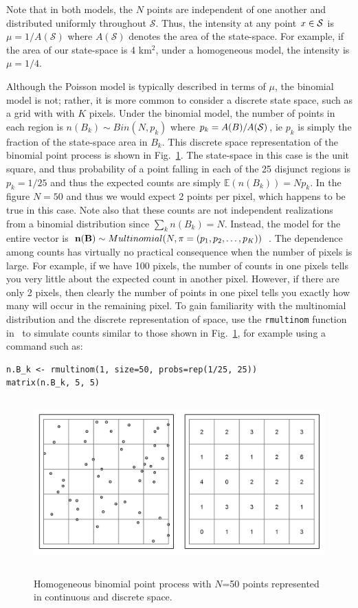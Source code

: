 Note that in both models, the $N$ points are independent
of one another and distributed uniformly
throughout $\mathcal{S}$. Thus, the intensity at any point $x \in
\cal{S}$ is $\mu = 1 / A(\mathcal{S})$ where $A(\mathcal{S})$ denotes
the area of the state-space. For example, if the area of our
state-space is 4 km$^2$,
under a homogeneous model, the intensity is $\mu = 1/4$.

Although the Poisson model is typically described in terms of $\mu$,
the binomial model is not; rather, it
is more common to consider a discrete state space, such as a grid with
with $K$ pixels. Under the binomial model, the number of points in
each region is $n(B_k) \sim Bin(N, p_k)$
where $p_k = A(B)/A(\cal{S})$, ie $p_k$ is simply the fraction of
the state-space area in $B_k$. This discrete space representation of
the binomial point process is shown in Fig.~\ref{ch9:fig:homo}. The
state-space in this case is the unit square, and thus probability of a
point falling in each of the 25 disjunct regions is $p_k = 1/25$ and
thus the expected counts are simply $\mathbb{E}(n(B_k)) = Np_k$. In
the figure $N=50$ and thus we would expect 2 points per pixel, which
happens to be true in this case. Note also that these counts are not
independent realizations from a binomial distribution since $\sum_k
n(B_k) = N$. Instead, the model for the entire vector
is ${\bf n(B)} \sim Multinomial(N, {\mathbf{\pi}} = (p_1, p_2, \dots,
p_K))$ \citep{illian:2008}. The dependence among counts has virtually
no practical consequence when the number of pixels is large. For
example, if we have 100 pixels, the number of counts in one pixels
tells you very little about the expected count in another
pixel. However, if there are only 2 pixels, then clearly the number of
points in one pixel tells you exactly how many will occur in the
remaining pixel. To gain familiarity with the multinomial distribution
and the discrete representation of space, use the \verb+rmultinom+
function in \R~to simulate counts similar to those shown in
Fig.~\ref{ch9:fig:homo}, for example using a command
such as:

\begin{verbatim}
n.B_k <- rmultinom(1, size=50, probs=rep(1/25, 25))
matrix(n.B_k, 5, 5)
\end{verbatim}


\begin{figure}
\centering
\includegraphics[width=5in,height=2.5in]{figs/homoPlots}
\label{ch9:fig:homo}
\caption{Homogeneous binomial point process with $N$=50 points
  represented in continuous and discrete space.}
\end{figure}


